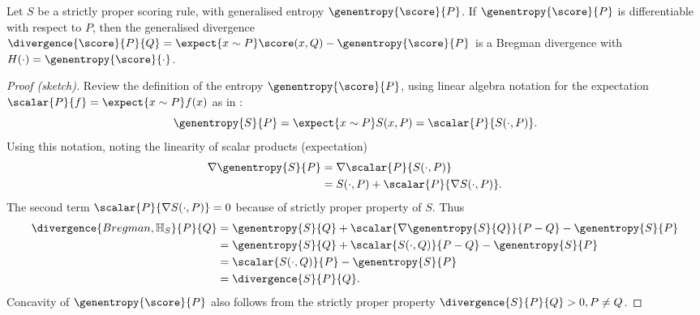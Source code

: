 \begin{statement}
	Let $S$ be a strictly proper scoring rule, with generalised entropy $\genentropy{\score}{P}$. If $\genentropy{\score}{P}$ is differentiable with respect to $P$, then the generalised divergence $\divergence{\score}{P}{Q} = \expect{x\sim P}\score(x,Q) - \genentropy{\score}{P}$ is a Bregman divergence with $H(\cdot) = \genentropy{\score}{\cdot}$.
\begin{proof}[Proof (sketch)]
	Review the definition of the entropy $\genentropy{\score}{P}$, using linear algebra notation for the expectation $\scalar{P}{f} = \expect{x\sim P}f(x)$ as in \citep{Amari2010}:
		\begin{equation}
			\genentropy{S}{P} = \expect{x \sim P}S(x,P) = \scalar{P}{S(\cdot,P)}.
		\end{equation}
	Using this notation, noting the linearity of scalar products (expectation)
		\begin{align}
			\nabla\genentropy{S}{P} &=  \nabla\scalar{P}{S(\cdot,P)}\\
				&= S(\cdot,P) + \scalar{P}{\nabla S(\cdot,P)}.
		\end{align}
	The second term $\scalar{P}{\nabla S(\cdot,P)}=0$ because of strictly proper property of $S$. Thus
 		\begin{align}
 		 	\divergence{Bregman,\mathbb{H}_{S}}{P}{Q}&= \genentropy{S}{Q}  + \scalar{\nabla \genentropy{S}{Q}}{P-Q} -  \genentropy{S}{P} \\
 		 		&= \genentropy{S}{Q} + \scalar{S(\cdot,Q)}{P - Q} -  \genentropy{S}{P}\\
 		 		&= \scalar{S(\cdot,Q)}{P} - \genentropy{S}{P}\\
 		 		&= \divergence{S}{P}{Q}.
 		\end{align}
 		Concavity of $\genentropy{\score}{P}$ also follows from the strictly proper property $\divergence{S}{P}{Q}>0,P\neq Q$.
\end{proof}
\end{statement}

